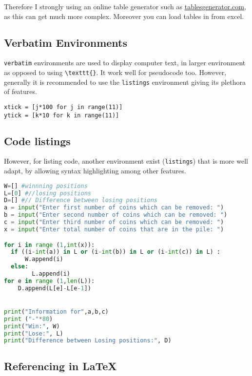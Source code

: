 \documentclass[11pt,a4paper,titlepage]{article}
\begin{document}
Therefore I strongly using an online table generator such as \href{https://www.tablesgenerator.com/latex_tables}{tablesgenerator.com}, as this can get much more complex. Moreover you can load tables in from excel.

\medskip

\subsection{Verbatim Environments}

\texttt{verbatim} environments are used to display computer text, in larger environment as opposed to using \texttt{\textbackslash texttt\{\}}. It work well for pseudocode too. However, generally it is recommended to use the \texttt{listings} environment giving its plethora of features. 

\begin{verbatim}
xtick = [j*100 for j in range(11)]
ytick = [k*10 for k in range(11)]
\end{verbatim}

\subsection{Code listings}

However, for listing code, another environment exist (\texttt{listings}) that is more well adapt, by allowing syntax highlighting among other features.

\begin{lstlisting}[language=Python]
W=[] #winnning positions
L=[0] #//losing positions
D=[] #// Difference between losing positions
a = input("Enter first number of coins which can be removed: ")
b = input("Enter second number of coins which can be removed: ")
c = input("Enter third number of coins which can be removed: ")
x = input("Enter total number of coins that are in the pile: ")

for i in range (1,int(x)):
  if ((i-int(a)) in L or (i-int(b)) in L or (i-int(c)) in L) :
      W.append(i)
  else:
        L.append(i)
for e in range (1,len(L)):
    D.append(L[e]-L[e-1])


print("Information for",a,b,c)
print ("-"*80)
print("Win:", W)
print("Lose:", L)
print("Difference between Losing positions:", D)
\end{lstlisting}


\subsection{Referencing in \LaTeX{}}
\end{document}
